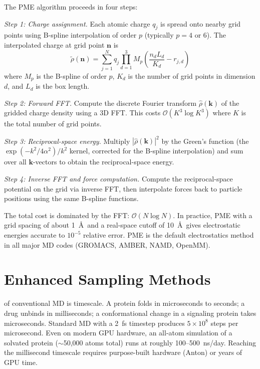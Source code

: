 The PME algorithm proceeds in four steps:

\emph{Step 1: Charge assignment.} Each atomic charge $q_j$ is spread onto nearby grid points using B-spline interpolation of order $p$ (typically $p = 4$ or 6). The interpolated charge at grid point $\mathbf{n}$ is
\begin{equation}
\label{eq:pme-charge}
\tilde{\rho}(\mathbf{n}) = \sum_{j=1}^N q_j \prod_{d=1}^3 M_p\!\left(\frac{n_d L_d}{K_d} - r_{j,d}\right)
\end{equation}
where $M_p$ is the B-spline of order $p$, $K_d$ is the number of grid points in dimension $d$, and $L_d$ is the box length.

\emph{Step 2: Forward FFT.} Compute the discrete Fourier transform $\hat{\rho}(\mathbf{k})$ of the gridded charge density using a 3D FFT. This costs $\mathcal{O}(K^3 \log K^3)$ where $K$ is the total number of grid points.

\emph{Step 3: Reciprocal-space energy.} Multiply $|\hat{\rho}(\mathbf{k})|^2$ by the Green's function (the $\exp(-k^2/4\alpha^2)/k^2$ kernel, corrected for the B-spline interpolation) and sum over all $\mathbf{k}$-vectors to obtain the reciprocal-space energy.

\emph{Step 4: Inverse FFT and force computation.} Compute the reciprocal-space potential on the grid via inverse FFT, then interpolate forces back to particle positions using the same B-spline functions.

The total cost is dominated by the FFT: $\mathcal{O}(N \log N)$. In practice, PME with a grid spacing of about 1~\AA\ and a real-space cutoff of 10~\AA\ gives electrostatic energies accurate to $10^{-5}$ relative error. PME is the default electrostatics method in all major MD codes (GROMACS, AMBER, NAMD, OpenMM).

\section{Enhanced Sampling Methods}
\label{sec:enhanced-sampling}

 of conventional MD is timescale. A protein folds in microseconds to seconds; a drug unbinds in milliseconds; a conformational change in a signaling protein takes microseconds. Standard MD with a 2~fs timestep produces $5 \times 10^8$ steps per microsecond. Even on modern GPU hardware, an all-atom simulation of a solvated protein ($\sim$50,000 atoms total) runs at roughly 100--500~ns/day. Reaching the millisecond timescale requires purpose-built hardware (Anton) or years of GPU time.

